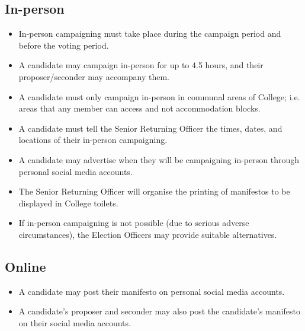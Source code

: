 \documentclass[12pt]{article}
\begin{document}
    \subsection{In-person}
    \begin{itemize}
        \item In-person campaigning must take place during the campaign period and before the voting period.
        \item A candidate may campaign in-person for up to 4.5 hours, and their proposer/seconder may accompany them.
        \item A candidate must only campaign in-person in communal areas of College; i.e. areas that any member can access and not accommodation blocks.
        \item A candidate must tell the Senior Returning Officer the times, dates, and locations of their in-person campaigning.
        \item A candidate may advertise when they will be campaigning in-person through personal social media accounts.
        \item The Senior Returning Officer will organise the printing of manifestos to be displayed in College toilets.
        \item If in-person campaigning is not possible (due to serious adverse circumstances), the Election Officers may provide suitable alternatives.
    \end{itemize}
    \subsection{Online}
    \begin{itemize}
        \item A candidate may post their manifesto on personal social media accounts.
        \item A candidate's proposer and seconder may also post the candidate's manifesto on their social media accounts.
    \end{itemize}
\end{document}
